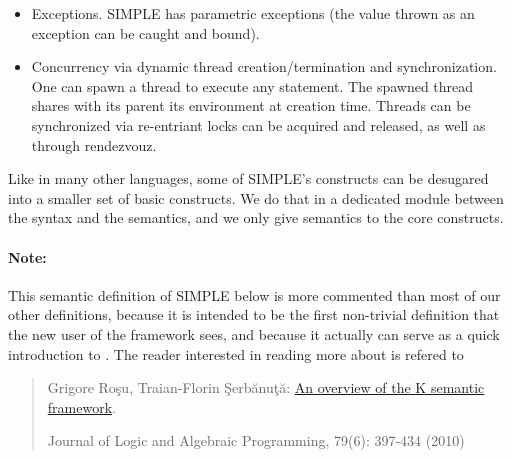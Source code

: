 {\begin{itemize}
next value in the input buffer, and the statement \texttt{write(e)}
evaluates \texttt{e} and outputs its value to the output buffer.  The
input and output buffers are lists of values.
\item Exceptions.  SIMPLE has parametric exceptions (the value thrown as
an exception can be caught and bound).
\item Concurrency via dynamic thread creation/termination and
synchronization.  One can spawn a thread to execute any statement.
The spawned thread shares with its parent its environment at creation time.
Threads can be synchronized via re-entriant locks can be acquired and released,
as well as through rendezvouz.
\end{itemize}
Like in many other languages, some of SIMPLE's constructs can be
desugared into a smaller set of basic constructs.  We do that in a 
dedicated module between the syntax and the semantics, and we only
give semantics to the core constructs.


\paragraph{Note:}{
This \K semantic definition of SIMPLE below is more commented than most
of our other \K definitions, because it is intended to be the first
non-trivial \K definition that the new user of the \K framework sees, and
because it actually can serve as a quick introduction to \K.  The reader
interested in reading more about \K is refered to
\begin{quote}
Grigore Ro\c su, Traian-Florin \c Serb\u anu\c t\u a:
\href{http://dx.doi.org/10.1016/j.jlap.2010.03.012}{An overview of the K semantic framework}.

Journal of Logic and Algebraic Programming, 79(6): 397-434 (2010)
\end{quote}
}
}

\vspace*{3ex}
